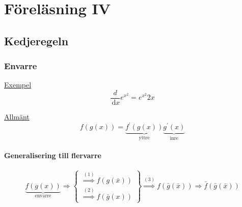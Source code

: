 \documentclass[a4paper]{article}
\begin{document}
\newpage
\section{Föreläsning IV}
\subsection{Kedjeregeln}

\subsubsection*{Envarre}

\underline{Exempel} \[\frac{d}{\,\mathrm{d}x} e^{x^2} = e^{x^2}2x\]

\underline{Allmänt} \[f(g(x)) = \underbrace{f^{\prime}(g(x))}_{\text{yttre}} \underbrace{g^{\prime}(x)}_{\text{inre}} \]

\paragraph{Generalisering till flervarre}

\[
	\underbrace{f(g(x))}_{\text{envarre}} \Rightarrow \left\{\begin{array}{rcl}
	\overset{(1)}{\Rightarrow} f(g(\bar{x})) \\
	\overset{(2)}{\Rightarrow} f(\bar{g}(x))
	\end{array}\right\}
	\overset{(3)}{\Rightarrow} f(\bar{g}(\bar{x})) \Rightarrow \bar{f}(\bar{g}(\bar{x}))
\]
\end{document}
